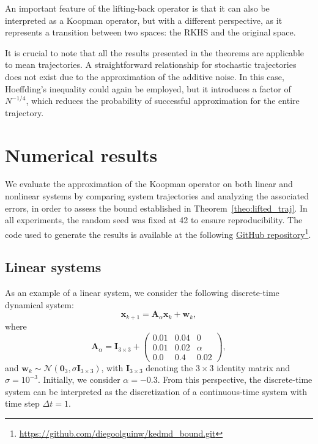 \documentclass{article}
\begin{document}
An important feature of the lifting-back operator is that it can also be interpreted as a Koopman operator, but with a different perspective, as it represents a transition between two spaces: the RKHS and the original space.

It is crucial to note that all the results presented in the theorems are applicable to mean trajectories. A straightforward relationship for stochastic trajectories does not exist due to the approximation of the additive noise. In this case, Hoeffding's inequality could again be employed, but it introduces a factor of $N^{-1/4}$, which reduces the probability of successful approximation for the entire trajectory.

\section{Numerical results}
We evaluate the approximation of the Koopman operator on both linear and nonlinear systems by comparing system trajectories and analyzing the associated errors, in order to assess the bound established in Theorem~\ref{theo:lifted_traj}. In all experiments, the random seed was fixed at 42 to ensure reproducibility. The code used to generate the results is available at the following \href{https://github.com/diegoolguinw/kedmd_bound.git}{GitHub repository}\footnote{\url{https://github.com/diegoolguinw/kedmd\_bound.git}}. 

\subsection*{Linear systems}

As an example of a linear system, we consider the following discrete-time dynamical system:
\[
\mathbf{x}_{k+1} = \mathbf{A}_\alpha\mathbf{x}_k + \mathbf{w}_k,
\]
where
\[
\mathbf{A}_\alpha = 
\mathbf{I}_{3\times 3}
+ 
\begin{pmatrix}
    0.01 & 0.04 & 0 \\
    0.01 & 0.02 & \alpha \\
    0.0 & 0.4 & 0.02
\end{pmatrix},
\]
and $\mathbf{w}_k \sim \mathcal{N}(\mathbf{0}_{3}, \sigma \mathbf{I}_{3\times 3})$, with $\mathbf{I}_{3\times 3}$ denoting the $3 \times 3$ identity matrix and $\sigma = 10^{-3}$. Initially, we consider $\alpha = -0.3$. From this perspective, the discrete-time system can be interpreted as the discretization of a continuous-time system with time step $\Delta t = 1$.
\end{document}

